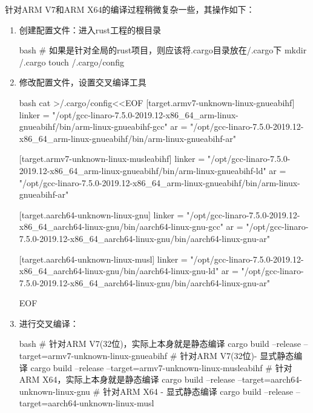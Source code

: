 针对ARM V7和ARM X64的编译过程稍微复杂一些，其操作如下：
\begin{enumerate}
  \item 创建配置文件：进入rust工程的根目录
\begin{code-block}{bash}
# 如果是针对全局的rust项目，则应该将.cargo目录放在/.cargo下
mkdir /.cargo
touch /.cargo/config
\end{code-block}

  \item 修改配置文件，设置交叉编译工具
\begin{code-block}{bash}
cat >/.cargo/config<<EOF
[target.armv7-unknown-linux-gnueabihf]
linker = "/opt/gcc-linaro-7.5.0-2019.12-x86_64_arm-linux-gnueabihf/bin/arm-linux-gnueabihf-gcc"
ar = "/opt/gcc-linaro-7.5.0-2019.12-x86_64_arm-linux-gnueabihf/bin/arm-linux-gnueabihf-ar"

[target.armv7-unknown-linux-musleabihf]
linker = "/opt/gcc-linaro-7.5.0-2019.12-x86_64_arm-linux-gnueabihf/bin/arm-linux-gnueabihf-ld"
ar = "/opt/gcc-linaro-7.5.0-2019.12-x86_64_arm-linux-gnueabihf/bin/arm-linux-gnueabihf-ar"

[target.aarch64-unknown-linux-gnu]
linker = "/opt/gcc-linaro-7.5.0-2019.12-x86_64_aarch64-linux-gnu/bin/aarch64-linux-gnu-gcc"
ar = "/opt/gcc-linaro-7.5.0-2019.12-x86_64_aarch64-linux-gnu/bin/aarch64-linux-gnu-ar"

[target.aarch64-unknown-linux-musl]
linker = "/opt/gcc-linaro-7.5.0-2019.12-x86_64_aarch64-linux-gnu/bin/aarch64-linux-gnu-ld"
ar = "/opt/gcc-linaro-7.5.0-2019.12-x86_64_aarch64-linux-gnu/bin/aarch64-linux-gnu-ar"

EOF
\end{code-block}

  \item 进行交叉编译：
\begin{code-block}{bash}
# 针对ARM V7(32位)，实际上本身就是静态编译
cargo build --release --target=armv7-unknown-linux-gnueabihf
# 针对ARM V7(32位)- 显式静态编译
cargo build --release --target=armv7-unknown-linux-musleabihf
# 针对ARM X64，实际上本身就是静态编译
cargo build --release --target=aarch64-unknown-linux-gnu
# 针对ARM X64 - 显式静态编译
cargo build --release --target=aarch64-unknown-linux-musl
\end{code-block}
\end{enumerate}

